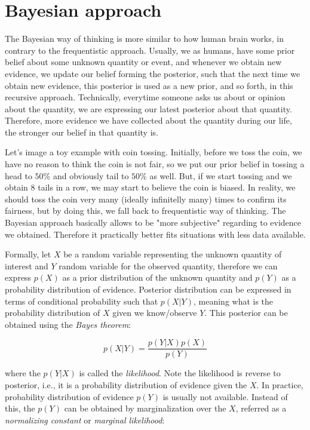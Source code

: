 \documentclass[
  digital, %
  oneside, %
  lof,     %
  lot,     %
]{fithesis4}
\begin{document}
\section{Bayesian approach}

The Bayesian way of thinking is more similar to how human 
brain works, in contrary to the frequentistic approach. 
Usually, we as humans, have some prior belief about some 
unknown quantity or event, and whenever we obtain new 
evidence, we update our belief forming the posterior, such 
that the next time we obtain new evidence, this posterior 
is used as a new prior, and so forth, in this recursive approach.
Technically, everytime someone asks us about or opinion 
about the quantity, we are expressing our latest posterior 
about that quantity. 
Therefore, more evidence we have collected about the 
quantity during our life, the stronger our belief in 
that quantity is.

Let's image a toy example with coin tossing. 
Initially, before we toss the coin, we have no reason 
to think the coin is not fair, so we put our prior belief 
in tossing a head to $50\%$ and obviously tail to 
$50\%$ as well. 
But, if we start tossing and we obtain 8 tails in a row, 
we may start to believe the coin is biased. 
In reality, we should toss the coin very many (ideally 
infinitelly many) times to confirm its fairness, but 
by doing this, we fall back to frequentistic way of 
thinking. 
The Bayesian approach basically allows to be 
"more subjective" regarding to evidence we obtained. 
Therefore it practically better fits situations with 
less data available.

Formally, let $X$ be a random variable representing 
the unknown quantity of interest and $Y$ random variable for 
the observed quantity, therefore we can express $p(X)$ 
as a prior distribution of the unknown quantity and 
$p(Y)$ as a probability distribution of evidence. 
Posterior distribution can be expressed in terms of 
conditional probability such that $p(X | Y)$, meaning 
what is the probability distribution of $X$ given we 
know/observe $Y$. 
This posterior can be obtained using the \textit{Bayes 
theorem}:

\begin{equation}\label{eq:bayes-theorem}
p( X | Y ) = \frac{p( Y | X ) p(X)}{p(Y)}
\end{equation}

where the $p( Y | X )$ is called the \textit{likelihood}.
Note the likelihood is reverse to posterior, i.e., it 
is a probability distribution of evidence given the $X$.
In practice, probability distribution of evidence $p(Y)$ 
is usually not available. 
Instead of this, the $p(Y)$ can be obtained by 
marginalization over the $X$, referred as a 
\textit{normalizing constant} or \textit{marginal likelihood}:
\end{document}
